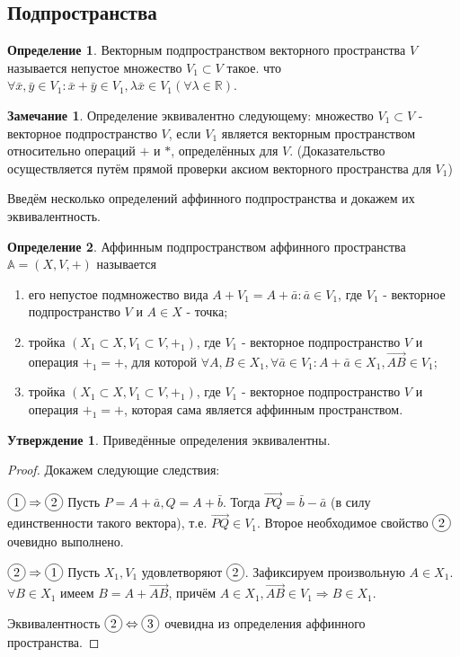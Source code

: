 \documentclass[a4paper, 12pt]{article}
\newcommand*\circled[1]{\tikz[baseline=(char.base)]{
            \node[shape=circle,draw,inner sep=2pt] (char) {#1};}}
\theoremstyle{definition}
\newtheorem*{definition}{Определение}
\newtheorem*{subtheorem}{Утверждение}
\newtheorem*{remark}{Замечание}
\begin{document}
	\subsection{Подпространства}
	\begin{definition}
		Векторным подпространством векторного пространства $V$ называется непустое множество $V_{1} \subset V$ такое. что $\forall\bar{x}, \bar{y}\in V_{1}: \bar{x} + \bar{y} \in V_{1}, \lambda\bar{x} \in V_{1} (\forall\lambda \in\mathbb{R})$.
	\end{definition}
	\begin{remark}
		Определение эквивалентно следующему: множество $V_{1} \subset V$ - векторное подпространство $V$, если $V_{1}$ является векторным пространством относительно операций $+$ и $*$, определённых для $V$.
		(Доказательство осуществляется путём прямой проверки аксиом векторного пространства для $V_{1}$)
	\end{remark}
	Введём несколько определений аффинного подпространства и докажем их эквивалентность.
	\begin{definition}
		Аффинным подпространством аффинного пространства $\mathbb{A} = (X, V, +)$ называется
		\begin{enumerate}
			\item его непустое подмножество вида $A + V_{1} = {A + \bar{a}:\bar{a} \in V_{1}}$, где $V_{1}$ - векторное подпространство $V$ и $A \in X$ - точка;
			\item тройка $(X_{1}\subset X, V_{1} \subset V, +_{1})$, где $V_{1}$ - векторное подпространство $V$ и операция $+_{1} = +$,  для которой $\forall A,B \in X_{1}, \forall \bar{a} \in V_{1}: A + \bar{a} \in X_{1}, \overrightarrow{AB} \in V_{1}$;
			\item тройка $(X_{1}\subset X, V_{1} \subset V, +_{1})$, где $V_{1}$ - векторное подпространство $V$ и операция $+_{1} = +$,  которая сама является аффинным пространством.
		\end{enumerate}
	\end{definition}
	\begin{subtheorem}
		Приведённые определения эквивалентны.
	\end{subtheorem}
	\begin{proof}
		Докажем следующие следствия:

		$\circled{1}\Rightarrow\circled{2}$  Пусть $P = A + \bar{a}, Q = A + \bar{b}$. Тогда $\overrightarrow{PQ} = \bar{b} - \bar{a}$ (в силу единственности такого вектора), т.е. $\overrightarrow{PQ} \in V_{1}$. Второе необходимое свойство $\circled{2}$ очевидно выполнено.

		$\circled{2}\Rightarrow\circled{1}$  Пусть $X_{1}, V_{1}$ удовлетворяют $\circled{2}$. Зафиксируем произвольную $A \in X_{1}$. $\forall B\in X_{1}$ имеем $B = A + \overrightarrow{AB}$, причём $A \in X_{1}, \overrightarrow{AB} \in V_{1} \Rightarrow B \in X_{1}$.
		
		Эквивалентность $\circled{2}\Leftrightarrow\circled{3}$ очевидна из определения аффинного пространства.
	\end{proof}
\end{document}
